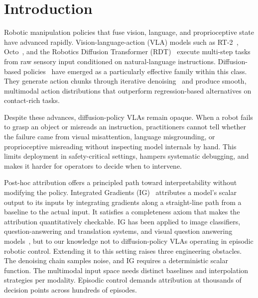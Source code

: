 \documentclass{article}
\begin{document}
\section{Introduction}

Robotic manipulation policies that fuse vision, language, and proprioceptive state have advanced rapidly.
Vision-language-action (VLA) models such as RT-2~\cite{zitkovich2023rt2}, Octo~\cite{team2024octo}, and the Robotics Diffusion Transformer (RDT)~\cite{liu2024rdt} execute multi-step tasks from raw sensory input conditioned on natural-language instructions.
Diffusion-based policies~\cite{chi2023diffusion} have emerged as a particularly effective family within this class.
They generate action chunks through iterative denoising~\cite{ho2020ddpm} and produce smooth, multimodal action distributions that outperform regression-based alternatives on contact-rich tasks.

Despite these advances, diffusion-policy VLAs remain opaque.
When a robot fails to grasp an object or misreads an instruction, practitioners cannot tell whether the failure came from visual misattention, language misgrounding, or proprioceptive misreading without inspecting model internals by hand.
This limits deployment in safety-critical settings, hampers systematic debugging, and makes it harder for operators to decide when to intervene.

Post-hoc attribution offers a principled path toward interpretability without modifying the policy.
Integrated Gradients (IG)~\cite{sundararajan2017axiomatic} attributes a model's scalar output to its inputs by integrating gradients along a straight-line path from a baseline to the actual input.
It satisfies a completeness axiom that makes the attribution quantitatively checkable.
IG has been applied to image classifiers, question-answering and translation systems, and visual question answering models~\cite{sundararajan2017axiomatic,mudrakarta2018did}, but to our knowledge not to diffusion-policy VLAs operating in episodic robotic control.
Extending it to this setting raises three engineering obstacles.
The denoising chain samples noise, and IG requires a deterministic scalar function.
The multimodal input space needs distinct baselines and interpolation strategies per modality.
Episodic control demands attribution at thousands of decision points across hundreds of episodes.
\end{document}
